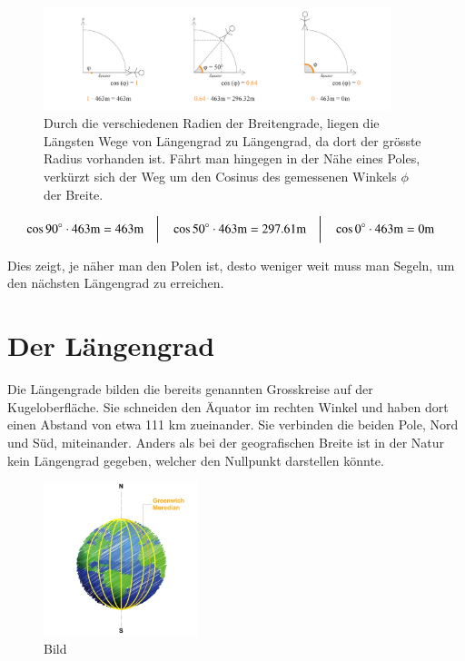 \begin{refsection}
\begin{figure}[htbp]
\centering
\includegraphics[width=0.9\textwidth]{kugel/Korrekturbeiwert.jpg}
\caption{Durch die verschiedenen Radien der Breitengrade, liegen die Längsten Wege von Längengrad zu Längengrad, da dort der grösste Radius vorhanden ist. Fährt man hingegen in der Nähe eines Poles, verkürzt sich der Weg um den Cosinus des gemessenen Winkels $\phi$ der Breite.}
\end{figure}

\[
\begin{aligned}
&\cos 90^\circ \cdot 463\text{m} = 463\text{m}
&
&\text{\bigg \vert}
&
&\cos 50^\circ \cdot 463\text{m} = 297.61\text{m}
&
&\text{\bigg \vert}
&
&\cos 0^\circ \cdot 463\text{m} = 0\text{m}
\end{aligned}
\]

Dies zeigt, je näher man den Polen ist, desto weniger weit muss man Segeln, um den nächsten Längengrad zu erreichen.



\section{Der Längengrad}
Die Längengrade bilden die bereits genannten Grosskreise auf der Kugeloberfläche.
Sie schneiden den Äquator im rechten Winkel und haben dort einen Abstand von etwa 111 km zueinander. Sie verbinden die beiden Pole, Nord und Süd, miteinander. Anders als bei der geografischen Breite ist in der Natur kein Längengrad gegeben, welcher den Nullpunkt darstellen könnte.

\begin{figure}[htbp]
\centering
\includegraphics[width=0.4\textwidth]{kugel/Laengengrad.jpg}
\caption{Bild}
\end{figure}



\end{refsection}
